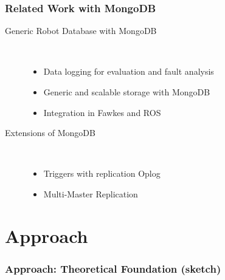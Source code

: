 \begin{frame}
  \frametitle{Related Work with MongoDB}
  \begin{description}
  \item[Generic Robot Database with MongoDB~\cite{RoboDB}]%
                \hfill \\
    \begin{itemize}
    \item Data logging for evaluation and fault analysis
    \item Generic and scalable storage with MongoDB
    \item Integration in Fawkes and ROS
    \end{itemize}
\bigskip
  \item[Extensions of  MongoDB]%
                \hfill \\
    \begin{itemize}
    \item Triggers with replication Oplog~\cite{mongodb-trigger}
    \item Multi-Master Replication~\cite{mongodb-multi-master}
    \end{itemize}
  \end{description}
\end{frame}


\section{Approach}
\begin{frame}
  \frametitle{Approach: Theoretical Foundation (sketch)}
\end{frame}

